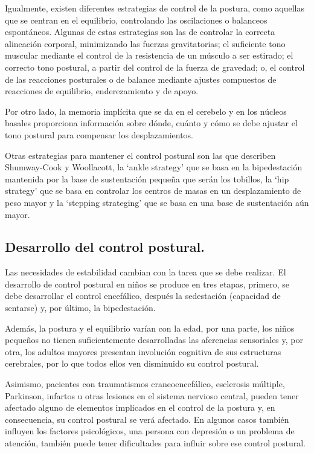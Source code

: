 Igualmente, existen diferentes estrategias de control de la postura, como aquellas que se centran en el equilibrio, controlando las oscilaciones o balanceos espontáneos. Algunas de estas estrategias son las de controlar la correcta alineación corporal, minimizando las fuerzas gravitatorias; el suficiente tono muscular mediante el control de la resistencia de un músculo a ser estirado; el correcto tono postural, a partir del control de la fuerza de gravedad; o, el control de las reacciones posturales o de balance mediante ajustes compuestos de reacciones de equilibrio, enderezamiento y de apoyo. 

Por otro lado, la memoria implícita que se da en el cerebelo y en los núcleos basales proporciona información sobre dónde, cuánto y cómo se debe ajustar el tono postural para compensar los desplazamientos.

Otras estrategias para mantener el control postural son las que describen Shumway-Cook y Woollacott, la ‘ankle strategy’ que se basa en la bipedestación mantenida por la base de sustentación pequeña que serán los tobillos, la ‘hip strategy’ que se basa en controlar los centros de masas en un desplazamiento de peso mayor y la ‘stepping strateging’ que se basa en una base de sustentación aún mayor.

\subsection{Desarrollo del control postural.} 
Las necesidades de estabilidad cambian con la tarea que se debe realizar. El desarrollo de control postural en niños se produce en tres etapas, primero, se debe desarrollar el control encefálico, después la sedestación (capacidad de sentarse) y, por último, la bipedestación.

Además, la postura y el equilibrio varían con la edad, por una parte, los niños pequeños\cite{Libro3_pediatria} no tienen suficientemente desarrolladas las aferencias sensoriales y, por otra, los adultos mayores\cite{Libro4_mayores} presentan involución cognitiva de sus estructuras cerebrales, por lo que todos ellos ven disminuido su control postural.

Asimismo, pacientes con traumatismos craneoencefálico, esclerosis múltiple, Parkinson, infartos u otras lesiones en el sistema nervioso central, pueden tener afectado alguno de elementos implicados en el control de la postura y, en consecuencia, su control postural se verá afectado. En algunos casos también influyen los factores psicológicos, una persona con depresión o un problema de atención, también puede tener dificultades para influir sobre ese control postural.


